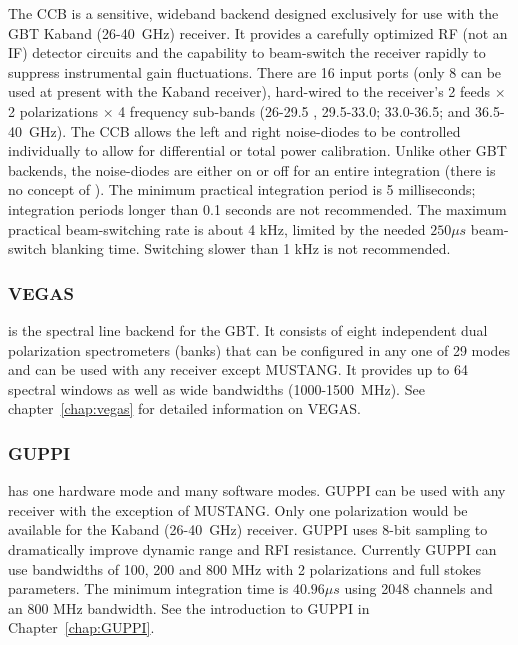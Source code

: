 The \gls{CCB} is a sensitive, wideband backend designed exclusively for use
with the \gls{GBT} \gls{Kaband} (26-40~GHz) receiver. It provides a carefully
optimized \gls{RF} (not an \gls{IF}) detector circuits and the capability to
beam-switch the receiver rapidly to suppress instrumental gain fluctuations. 
There are 16 input ports (only 8 can be used at present with the \gls{Kaband}
receiver), hard-wired to the receiver's 2 feeds $\times$ 2 polarizations
$\times$ 4 frequency sub-bands (26-29.5 , 29.5-33.0; 33.0-36.5; and 36.5-40~GHz).
The \gls{CCB} allows the left and right noise-diodes to be controlled individually
to allow for differential or total power calibration. Unlike other \gls{GBT}
backends, the noise-diodes are either on or off for an entire integration (there
is no concept of ). The minimum practical
integration period is 5 milliseconds; integration periods longer than 0.1 seconds
are not recommended. The maximum practical beam-switching rate is about 4 kHz,
limited by the needed $250\mu s$ beam-switch blanking time. Switching slower
than 1 kHz is not recommended.

\subsubsection{VEGAS}

 is the spectral line backend for the \gls{GBT}. It consists of
eight independent dual polarization spectrometers (banks) that can be configured in
any one of 29 modes and can be used with any receiver except \gls{MUSTANG}. It
provides up to 64 spectral windows as well as wide bandwidths (1000-1500~MHz).
See chapter~\ref{chap:vegas} for detailed information on \gls{VEGAS}.


\subsubsection{GUPPI}

 has one hardware mode and many software modes.  \gls{GUPPI}
can be used with any receiver with the exception of \gls{MUSTANG}.  Only one
polarization would be available for the \gls{Kaband} (26-40~GHz) receiver.
\gls{GUPPI} uses 8-bit sampling to dramatically improve dynamic range and
\gls{RFI} resistance.  Currently \gls{GUPPI} can use bandwidths of 100, 200
and 800 MHz with 2 polarizations and full stokes parameters.  The minimum
integration time is $40.96\mu s$ using 2048 channels and an 800 MHz bandwidth.
See the introduction to \gls{GUPPI} in Chapter~\ref{chap:GUPPI}.


